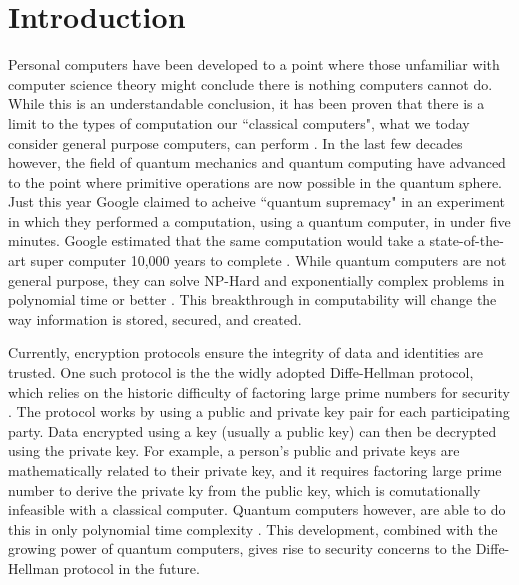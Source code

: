 \chapter{Introduction}
\label{chap:introduction}

Personal computers have been developed to a point where those unfamiliar with computer science theory might conclude there is nothing computers cannot do.
While this is an understandable conclusion, it has been proven that there is a limit to the types of computation our ``classical computers", what we today consider general purpose computers, can perform \cite{linz}.
In the last few decades however, the field of quantum mechanics and quantum computing have advanced to the point where primitive operations are now possible in the quantum sphere.
Just this year Google claimed to acheive ``quantum supremacy" in an experiment in which they performed a computation, using a quantum computer, in under five minutes. 
Google estimated that the same computation would take a state-of-the-art super computer 10,000 years to complete \cite{quantum_supremacy}. 
While quantum computers are not general purpose, they can solve NP-Hard and exponentially complex problems in polynomial time or better \cite{TODO}.
This breakthrough in computability will change the way information is stored, secured, and created.


Currently, encryption protocols ensure the integrity of data and identities are trusted.
One such protocol is the the widly adopted Diffe-Hellman protocol, which relies on the historic difficulty of factoring large prime numbers for security \cite{qc:agi}.
The protocol works by using a public and private key pair for each participating party.
Data encrypted using a key (usually a public key) can then be decrypted using the private key.
For example, a person's public and private keys are mathematically related to their private key, and it requires factoring large prime number to derive the private ky from the public key, which is comutationally infeasible with a classical computer.
Quantum computers however, are able to do this in only polynomial time complexity \cite{doi:10.1137/S0036144598347011}.
This development, combined with the growing power of quantum computers, gives rise to security concerns to the Diffe-Hellman protocol in the future.

